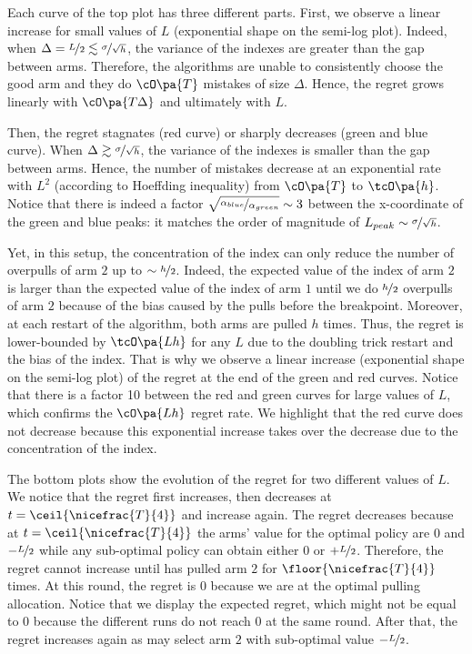 Each curve of the top plot has three different parts. First, we observe a linear increase for small values of $L$ (exponential shape on the semi-log plot). Indeed, when $\Delta = \nicefrac{L}{2} \lesssim \nicefrac{\sigma}{\sqrt{h}}$, the variance of the indexes are greater than the gap between arms. Therefore, the algorithms are unable to consistently choose the good arm and they do $\cO\pa{T}$ mistakes of size $\Delta$. Hence, the regret grows linearly with $\cO\pa{T\Delta}$ and ultimately with $L$. 

Then, the regret stagnates (red curve) or sharply decreases (green and blue curve). When $\Delta \gtrsim \nicefrac{\sigma}{\sqrt{h}}$, the variance of the indexes is smaller than the gap between arms. Hence, the number of mistakes decrease at an exponential rate with $L^2$ (according to Hoeffding inequality) from $\cO\pa{T}$ to $\tcO\pa{h}$. Notice that there is indeed a factor $\sqrt{\nicefrac{\alpha_{blue}}{ \alpha_{green}}} \sim 3$ between the x-coordinate of the green and blue peaks: it matches the order of magnitude of $L_{peak} \sim  \nicefrac{\sigma}{\sqrt{h}}$.

Yet, in this setup, the concentration of the index can only reduce the number of overpulls of arm $2$ up to $\sim \nicefrac{h}{2}$. Indeed, the expected value of the index of arm $2$ is larger than the expected value of the index of arm $1$ until we do $\nicefrac{h}{2}$ overpulls of arm $2$ because of the bias caused by the pulls before the breakpoint. Moreover, at each restart of the algorithm, both arms are pulled $h$ times. Thus, the regret is lower-bounded by $\tcO\pa{Lh}$ for any $L$ due to the doubling trick restart and the bias of the index. That is why we observe a linear increase (exponential shape on the semi-log plot) of the regret at the end of the green and red curves. Notice that there is a factor 10 between the red and green curves for large values of $L$, which confirms the $\cO\pa{Lh}$ regret rate. We highlight that the red curve does not decrease because this exponential increase takes over the decrease due to the concentration of the index.

The bottom plots show the evolution of the regret for two different values of $L$. We notice that the regret first increases, then decreases at $t = \ceil{\nicefrac{T}{4}}$  and increase again. The regret decreases because at $t = \ceil{\nicefrac{T}{4}}$ the arms' value for the optimal policy are $0$ and $-\nicefrac{L}{2}$  while any sub-optimal policy can obtain either $0$ or $+\nicefrac{L}{2}$. Therefore, the regret cannot increase until \wSWA has pulled arm $2$ for $\floor{\nicefrac{T}{4}}$ times. At this round, the regret is $0$ because we are at the optimal pulling allocation. Notice that we display the expected regret, which might not be equal to $0$ because the different runs do not reach $0$ at the same round.  After that, the regret increases again as \wSWA may select arm $2$ with sub-optimal value $-\nicefrac{L}{2}$.

